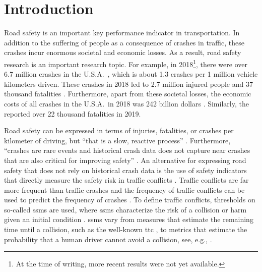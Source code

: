\section{Introduction}
\label{sec:introduction}

Road safety is an important key performance indicator in transportation. 
\cstartc In addition to the suffering of people as a consequence of crashes in traffic, these crashes incur enormous societal and economic losses.
As a result, \cendc road safety research is an important research topic.
For example, in 2018\cstarta\footnote{\cstarta At the time of writing, more recent results were not yet available.\cenda}\cenda, there were over 6.7 million crashes in the U.S.A.\ \autocite{nhtsa2020summary}, which is about 1.3 crashes per 1 million vehicle kilometers driven.
These crashes in 2018 led to 2.7 million injured people and 37 thousand fatalities \autocite{nhtsa2020summary}.
Furthermore, apart from these societal losses, the economic costs of all crashes in the U.S.A.\ in 2018 was 242 billion dollars \autocite{nhtsa2020summary}.
Similarly, the \textcite{eu2020roadsafety} reported over 22 thousand fatalities in 2019.

Road safety can be expressed in terms of injuries, fatalities, or crashes per kilometer of driving, but \cstartb ``that is a slow, reactive process'' \autocite{arun2021systematic}.
Furthermore, ``crashes are rare events and historical crash data does not capture near crashes that are also critical for improving safety'' \autocite{wang2021review}.
An alternative for expressing road safety \cendb that does not rely on historical crash data is the use of safety indicators that directly measure the safety risk in traffic conflicts \cstartb \autocite{arun2021systematic, wang2021review, tarko2018surrogate}\cendb.
Traffic conflicts are far more frequent than traffic crashes and the frequency of traffic conflicts can be used to predict the frequency of crashes \cstartb \autocite{tarko2018estimating, davis2011outline}\cendb.
\cstartb To define traffic conflicts, thresholds on so-called \acp{ssm} are used, where \acp{ssm} characterize the risk of a collision or harm given an initial condition \autocite{arun2021systematic}. \cendb
\acp{ssm} vary from measures that estimate the remaining time until a collision, such as the well-known \ac{ttc} \autocite{hayward1972near}, to metrics that estimate the probability that a human driver cannot avoid a collision, see, e.g., \autocite{wang2014evaluation}.

